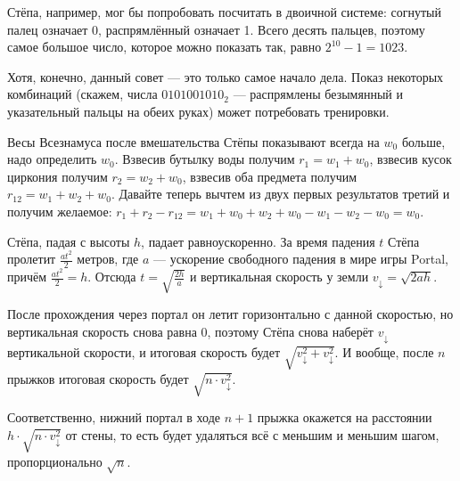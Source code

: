 \begin{itemize}
\itA Стёпа, например, мог бы попробовать посчитать в двоичной системе:
согнутый палец означает 0, распрямлённый означает 1. Всего десять пальцев,
поэтому самое большое число, которое можно показать так, равно $2^{10}-1 = 1023$.

Хотя, конечно, данный совет --- это только самое начало дела. Показ некоторых
комбинаций (скажем, числа $0101001010_2$ --- распрямлены безымянный и указательный
пальцы на обеих руках) может потребовать тренировки.


\itB Весы Всезнамуса после вмешательства Стёпы показывают всегда на $w_0$ больше, надо определить $w_0$.
Взвесив бутылку воды получим $r_1 = w_1 + w_0$, взвесив кусок циркония получим $r_2 = w_2 + w_0$,
взвесив оба предмета получим $r_{12} = w_1 + w_2 + w_0$. Давайте теперь вычтем из двух 
первых результатов третий и получим желаемое: 
$r_1 + r_2 - r_{12} = w_1 + w_0 + w_2 + w_0 - w_1 - w_2 - w_0 = w_0$.

\itC Стёпа, падая с высоты $h$, падает равноускоренно. За время падения $t$ Стёпа пролетит 
$\frac{at^2}{2}$ метров, где $a$ --- ускорение свободного падения в мире игры Portal, 
причём $\frac{at^2}{2} = h$. Отсюда $t = \sqrt{\frac{2h}{a}}$ и вертикальная скорость
у земли $v_\downarrow = \sqrt{2ah}$.

После прохождения через портал он летит горизонтально с данной скоростью, но вертикальная
скорость снова равна 0, поэтому Стёпа снова наберёт $v_\downarrow$ вертикальной скорости, и
итоговая скорость будет $\sqrt{v_\downarrow^2 + v_\downarrow^2}$.
И вообще, после $n$ прыжков итоговая скорость будет $\sqrt{n \cdot v_\downarrow^2}$.

Соответственно, нижний портал в ходе $n+1$ прыжка окажется на расстоянии 
$h \cdot \sqrt{n \cdot v_\downarrow^2}$ от стены,
то есть будет удаляться всё с меньшим и меньшим шагом, пропорционально $\sqrt{n}$.

\end{itemize}
